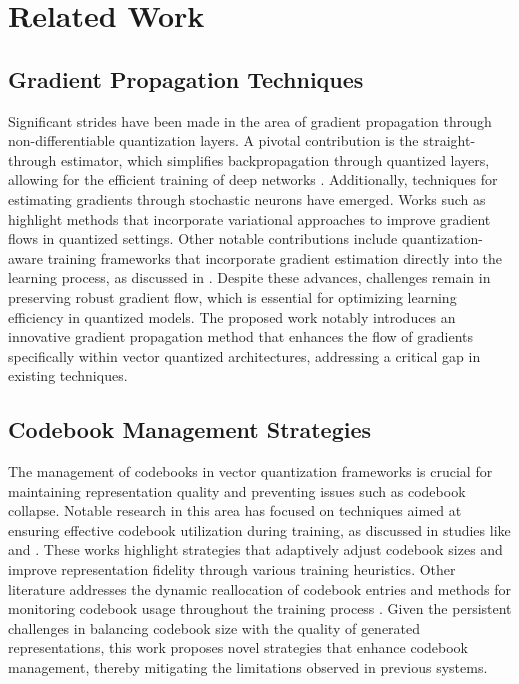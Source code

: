 \section{Related Work}

\subsection{Gradient Propagation Techniques}
Significant strides have been made in the area of gradient propagation through non-differentiable quantization layers. A pivotal contribution is the straight-through estimator, which simplifies backpropagation through quantized layers, allowing for the efficient training of deep networks \cite{straightthrough}. Additionally, techniques for estimating gradients through stochastic neurons have emerged. Works such as \cite{gradientneuron} highlight methods that incorporate variational approaches to improve gradient flows in quantized settings. Other notable contributions include quantization-aware training frameworks that incorporate gradient estimation directly into the learning process, as discussed in \cite{quantizationaware}. Despite these advances, challenges remain in preserving robust gradient flow, which is essential for optimizing learning efficiency in quantized models. The proposed work notably introduces an innovative gradient propagation method that enhances the flow of gradients specifically within vector quantized architectures, addressing a critical gap in existing techniques.

\subsection{Codebook Management Strategies}
The management of codebooks in vector quantization frameworks is crucial for maintaining representation quality and preventing issues such as codebook collapse. Notable research in this area has focused on techniques aimed at ensuring effective codebook utilization during training, as discussed in studies like \cite{codebookcollapse} and \cite{codebookutilization}. These works highlight strategies that adaptively adjust codebook sizes and improve representation fidelity through various training heuristics. Other literature addresses the dynamic reallocation of codebook entries and methods for monitoring codebook usage throughout the training process \cite{adaptivecodebook}. Given the persistent challenges in balancing codebook size with the quality of generated representations, this work proposes novel strategies that enhance codebook management, thereby mitigating the limitations observed in previous systems.

